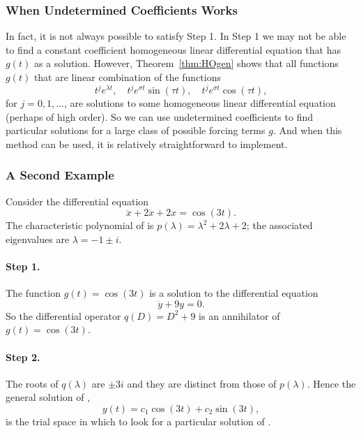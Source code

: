 \subsubsection*{When Undetermined Coefficients Works}

In fact, it is not always possible to satisfy Step 1.  In Step 1 we may not 
be able to find a constant coefficient homogeneous linear differential 
equation that has $g(t)$ as a solution.  However, Theorem~\ref{thm:HOgen} 
shows that all functions $g(t)$ that are 
linear combination of the functions
\[
t^je^{\lambda t},\quad t^je^{\sigma t}\sin(\tau t),\quad 
t^je^{\sigma t}\cos(\tau t),
\]
for $j=0,1,\ldots$, are solutions to some homogeneous linear differential 
equation (perhaps of high order).  So we can use 
undetermined coefficients to 
find particular solutions for a large class of possible forcing terms $g$.  
And when this method can be used, it is relatively straightforward to implement.


\subsubsection*{A Second Example}

Consider the differential equation
\begin{equation}  \label{e:undet1}
\ddot x + 2\dot x + 2x = \cos(3t).
\end{equation}
The characteristic polynomial of  is 
$p(\lambda)=\lambda^2+2\lambda+2$; the associated eigenvalues are 
$\lambda=-1\pm i$.

\paragraph{Step 1.} The function $g(t)=\cos(3t)$ is a solution to the 
differential equation
\begin{equation}  \label{e:undet2}
\ddot y + 9y=0.
\end{equation}
So the differential operator $q(D)=D^2+9$ is an 
annihilator of $g(t)=\cos(3t)$. 

\paragraph{Step 2.} The roots of $q(\lambda)$ are $\pm 3i$ and they are 
distinct from those of $p(\lambda)$.  Hence the 
general solution of , 
\begin{equation}   \label{E:undet2}
y(t) = c_1 \cos(3t)+ c_2 \sin(3t),
\end{equation}
is the trial space in which to look for a 
particular solution of .

